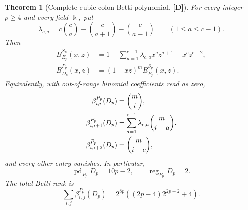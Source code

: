 \documentclass[11pt]{article}
\newtheorem{theorem}{Theorem}[section]
\theoremstyle{definition}
\theoremstyle{remark}
\newcommand{\kfield}{\Bbbk}
\begin{document}
\begin{theorem}[Complete cubic-colon Betti polynomial, {\bf[D]}]
\label{thm:colon-betti-polynomial}
For every integer \(p\ge4\) and every field \(\kfield\), put
\begin{equation}
\lambda_{c,a}=c\binom ca-\binom c{a+1}-\binom c{a-1}
\qquad(1\le a\le c-1).
\label{eq:colon-linear-ranks}
\end{equation}
Then
\begin{align}
B_{E_p}^{S_p}(x,z)
 &=1+\sum_{a=1}^{c-1}\lambda_{c,a}x^az^{a+1}+x^cz^{c+2},
 \label{eq:low-colon-betti}\\
B_{D_p}^{P_p}(x,z)
 &=(1+xz)^m B_{E_p}^{S_p}(x,z).
 \label{eq:full-colon-betti}
\end{align}
Equivalently, with out-of-range binomial coefficients read as zero,
\begin{align}
\beta_{i,i}^{P_p}(D_p)&=\binom mi,\notag\\
\beta_{i,i+1}^{P_p}(D_p)&=
 \sum_{a=1}^{c-1}\lambda_{c,a}\binom m{i-a},\label{eq:full-colon-rows}\\
\beta_{i,i+2}^{P_p}(D_p)&=\binom m{i-c},
\end{align}
and every other entry vanishes. In particular,
\begin{equation}
\operatorname{pd}_{P_p}D_p=10p-2,\qquad
\operatorname{reg}_{P_p}D_p=2.
\label{eq:colon-pd-reg}
\end{equation}
The total Betti rank is
\begin{equation}
\sum_{i,j}\beta_{i,j}^{P_p}(D_p)
=2^{8p}\left((2p-4)2^{2p-2}+4\right).
\label{eq:colon-total-rank}
\end{equation}
\end{theorem}
\end{document}
